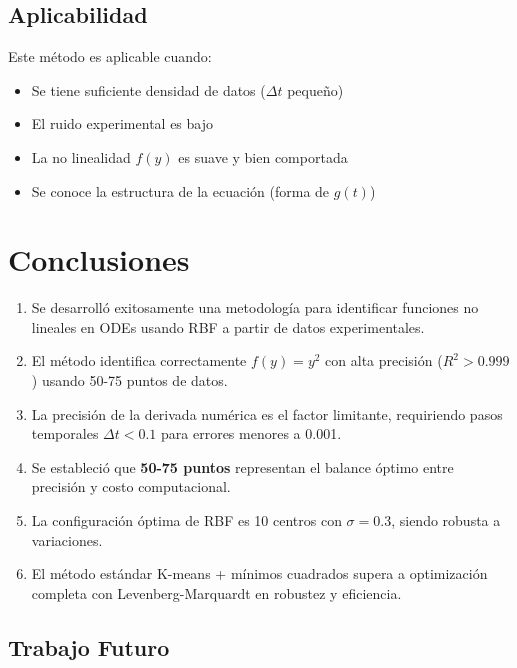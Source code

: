 \documentclass[11pt,a4paper]{article}
\begin{document}
\subsection{Aplicabilidad}

Este método es aplicable cuando:
\begin{itemize}
    \item Se tiene suficiente densidad de datos ($\Delta t$ pequeño)
    \item El ruido experimental es bajo
    \item La no linealidad $f(y)$ es suave y bien comportada
    \item Se conoce la estructura de la ecuación (forma de $g(t)$)
\end{itemize}

\section{Conclusiones}

\begin{enumerate}
    \item Se desarrolló exitosamente una metodología para identificar funciones no lineales en ODEs usando RBF a partir de datos experimentales.

    \item El método identifica correctamente $f(y) = y^2$ con alta precisión ($R^2 > 0.999$) usando 50-75 puntos de datos.

    \item La precisión de la derivada numérica es el factor limitante, requiriendo pasos temporales $\Delta t < 0.1$ para errores menores a 0.001.

    \item Se estableció que \textbf{50-75 puntos} representan el balance óptimo entre precisión y costo computacional.

    \item La configuración óptima de RBF es 10 centros con $\sigma = 0.3$, siendo robusta a variaciones.

    \item El método estándar K-means + mínimos cuadrados supera a optimización completa con Levenberg-Marquardt en robustez y eficiencia.
\end{enumerate}

\subsection{Trabajo Futuro}
\end{document}
